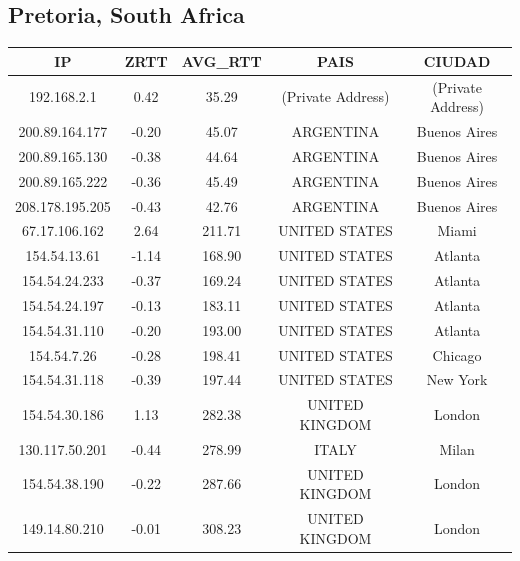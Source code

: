 \subsection{Pretoria, South Africa}

\begin{tabular}{|c@{\hspace{5ex}}c@{\hspace{5ex}}c@{\hspace{5ex}}c@{\hspace{5ex}}c|}
\hline
\rule{0pt}{1.2em}IP & ZRTT & AVG\_RTT & PAIS & CIUDAD\\[0.2em]
\hline

\rule{0pt}{1.2em} 192.168.2.1  &  0.42 & 35.29 & (Private Address) & (Private Address) \\[0.2em]
\rule{0pt}{1.2em} 200.89.164.177  &  -0.20 & 45.07 & ARGENTINA & Buenos Aires \\[0.2em]
\rule{0pt}{1.2em} 200.89.165.130  &  -0.38 & 44.64 & ARGENTINA & Buenos Aires \\[0.2em]
\rule{0pt}{1.2em} 200.89.165.222  &  -0.36 & 45.49 & ARGENTINA & Buenos Aires \\[0.2em]
\rule{0pt}{1.2em} 208.178.195.205  &  -0.43 & 42.76 & ARGENTINA & Buenos Aires\\[0.2em]
\rule{0pt}{1.2em} 67.17.106.162  &  2.64 & 211.71 & UNITED STATES & Miami \\[0.2em]
\rule{0pt}{1.2em} 154.54.13.61  &  -1.14 & 168.90 & UNITED STATES & Atlanta \\[0.2em]
\rule{0pt}{1.2em} 154.54.24.233  &  -0.37 & 169.24 & UNITED STATES & Atlanta \\[0.2em]
\rule{0pt}{1.2em} 154.54.24.197  &  -0.13 & 183.11 & UNITED STATES & Atlanta \\[0.2em]
\rule{0pt}{1.2em} 154.54.31.110  &  -0.20 & 193.00 & UNITED STATES & Atlanta \\[0.2em]
\rule{0pt}{1.2em} 154.54.7.26  &  -0.28 & 198.41 & UNITED STATES & Chicago \\[0.2em]
\rule{0pt}{1.2em} 154.54.31.118  &  -0.39 & 197.44 & UNITED STATES & New York \\[0.2em]
\rule{0pt}{1.2em} 154.54.30.186  &  1.13 & 282.38 & UNITED KINGDOM & London \\[0.2em]
\rule{0pt}{1.2em} 130.117.50.201  &  -0.44 & 278.99 & ITALY & Milan \\[0.2em]
\rule{0pt}{1.2em} 154.54.38.190  &  -0.22 & 287.66 & UNITED KINGDOM & London \\[0.2em]
\rule{0pt}{1.2em} 149.14.80.210  &  -0.01 & 308.23  & UNITED KINGDOM & London \\[0.2em]

\end{tabular}
